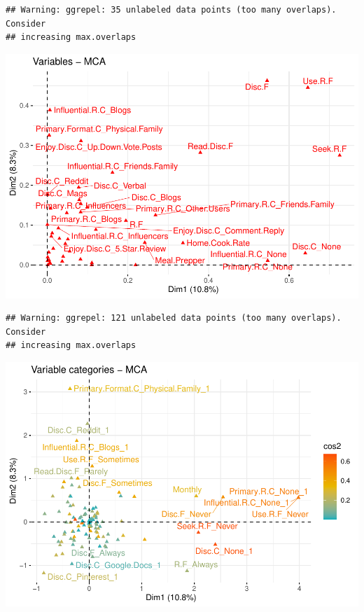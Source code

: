 \documentclass[
]{article}
\newenvironment{Shaded}{\begin{snugshade}}{\end{snugshade}}
\newcommand{\DataTypeTok}[1]{\textcolor[rgb]{0.13,0.29,0.53}{#1}}
\newcommand{\KeywordTok}[1]{\textcolor[rgb]{0.13,0.29,0.53}{\textbf{#1}}}
\newcommand{\NormalTok}[1]{#1}
\newcommand{\OtherTok}[1]{\textcolor[rgb]{0.56,0.35,0.01}{#1}}
\newcommand{\StringTok}[1]{\textcolor[rgb]{0.31,0.60,0.02}{#1}}
\begin{document}
\begin{verbatim}
## Warning: ggrepel: 35 unlabeled data points (too many overlaps). Consider
## increasing max.overlaps
\end{verbatim}

\includegraphics{Average-User-MCA_files/figure-latex/mca social all-2.pdf}

\begin{Shaded}
\end{Shaded}

\begin{verbatim}
## Warning: ggrepel: 121 unlabeled data points (too many overlaps). Consider
## increasing max.overlaps
\end{verbatim}

\includegraphics{Average-User-MCA_files/figure-latex/mca social all-3.pdf}
\end{document}
